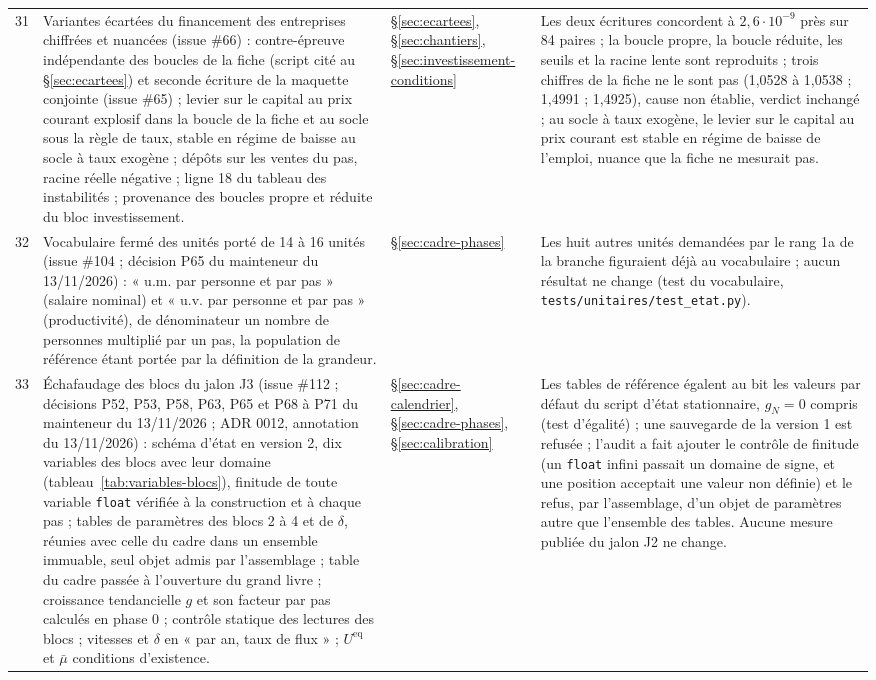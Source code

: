 \documentclass[11pt,a4paper]{article}
\begin{document}
\begin{center}
\begin{longtable}{p{0.5cm}>{\raggedright\arraybackslash}p{6.3cm}>{\raggedright\arraybackslash}p{2.1cm}>{\raggedright\arraybackslash}p{5.8cm}}
31 & Variantes écartées du financement des entreprises chiffrées et nuancées (issue \#66) : contre-épreuve indépendante des boucles de la fiche (script cité au \S\ref{sec:ecartees}) et seconde écriture de la maquette conjointe (issue \#65) ; levier sur le capital au prix courant explosif dans la boucle de la fiche et au socle sous la règle de taux, stable en régime de baisse au socle à taux exogène ; dépôts sur les ventes du pas, racine réelle négative ; ligne 18 du tableau des instabilités ; provenance des boucles propre et réduite du bloc investissement. & \S\ref{sec:ecartees}, \S\ref{sec:chantiers}, \S\ref{sec:investissement-conditions} & Les deux écritures concordent à $2{,}6 \cdot 10^{-9}$ près sur 84 paires ; la boucle propre, la boucle réduite, les seuils et la racine lente sont reproduits ; trois chiffres de la fiche ne le sont pas (1,0528 à 1,0538 ; 1,4991 ; 1,4925), cause non établie, verdict inchangé ; au socle à taux exogène, le levier sur le capital au prix courant est stable en régime de baisse de l'emploi, nuance que la fiche ne mesurait pas.\\
32 & Vocabulaire fermé des unités porté de 14 à 16 unités (issue \#104 ; décision P65 du mainteneur du 13/11/2026) : « u.m. par personne et par pas » (salaire nominal) et « u.v. par personne et par pas » (productivité), de dénominateur un nombre de personnes multiplié par un pas, la population de référence étant portée par la définition de la grandeur. & \S\ref{sec:cadre-phases} & Les huit autres unités demandées par le rang 1a de la branche figuraient déjà au vocabulaire ; aucun résultat ne change (test du vocabulaire, \nolinkurl{tests/unitaires/test_etat.py}).\\
33 & Échafaudage des blocs du jalon J3 (issue \#112 ; décisions P52, P53, P58, P63, P65 et P68 à P71 du mainteneur du 13/11/2026 ; ADR 0012, annotation du 13/11/2026) : schéma d'état en version 2, dix variables des blocs avec leur domaine (tableau~\ref{tab:variables-blocs}), finitude de toute variable \texttt{float} vérifiée à la construction et à chaque pas ; tables de paramètres des blocs 2 à 4 et de $\delta$, réunies avec celle du cadre dans un ensemble immuable, seul objet admis par l'assemblage ; table du cadre passée à l'ouverture du grand livre ; croissance tendancielle $g$ et son facteur par pas calculés en phase 0 ; contrôle statique des lectures des blocs ; vitesses et $\delta$ en « par an, taux de flux » ; $U^{\mathrm{eq}}$ et $\bar\mu$ conditions d'existence. & \S\ref{sec:cadre-calendrier}, \S\ref{sec:cadre-phases}, \S\ref{sec:calibration} & Les tables de référence égalent au bit les valeurs par défaut du script d'état stationnaire, $g_N = 0$ compris (test d'égalité) ; une sauvegarde de la version 1 est refusée ; l'audit a fait ajouter le contrôle de finitude (un \texttt{float} infini passait un domaine de signe, et une position acceptait une valeur non définie) et le refus, par l'assemblage, d'un objet de paramètres autre que l'ensemble des tables. Aucune mesure publiée du jalon J2 ne change.\\

\end{longtable}
\end{center}
\end{document}
